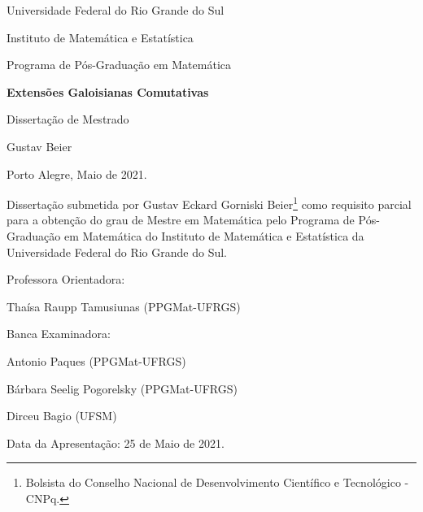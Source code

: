 \documentclass[12pt]{report}
\theoremstyle{definition}
\theoremstyle{remark}
\begin{document}

\thispagestyle{empty}
\begin{center} {\large Universidade Federal do Rio Grande do Sul
\par \vspace{0.2in} Instituto de Matemática e Estatística
\par \vspace{0.2in} Programa de Pós-Graduação em Matemática}
\par \vspace*{2.0in} {\Large \bf  Extensões Galoisianas Comutativas}
\par \vspace*{0.2in} {\Large \bf }
\par \vspace{1.2in} {\large Dissertação de Mestrado}
\par \vspace{1.2in} {\large Gustav Beier}
\par \vfill {\large Porto Alegre, Maio de 2021.}
\end{center}



{\large \noindent Dissertação submetida por Gustav Eckard Gorniski Beier\footnote{Bolsista do Conselho Nacional de Desenvolvimento Científico e Tecnológico  - CNPq.} como requisito parcial para a obtenção do grau de Mestre em Matemática pelo Programa de Pós-Graduação em Matemática do Instituto de Matemática e Estatística da Universidade Federal do Rio Grande do Sul.
\par \vspace{1.0in} Professora Orientadora:
\par \hspace{0.6in} Thaísa Raupp Tamusiunas (PPGMat-UFRGS)
\par \vspace{1.0in} Banca Examinadora:
\par \hspace{0.6in} Antonio Paques (PPGMat-UFRGS)
\par \hspace{0.6in} Bárbara Seelig Pogorelsky (PPGMat-UFRGS)
\par \hspace{0.6in} Dirceu Bagio (UFSM)
\thispagestyle{empty}
\par \vspace{1.0in} Data da Apresentação: 25 de Maio de 2021.}
\end{document}
